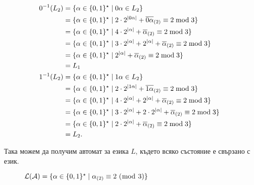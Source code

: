 \begin{align*}
  0^{-1}(L_2) & = \{\alpha \in \{0,1\}^\star \mid 0\alpha \in L_2\}\\
              & = \{\alpha \in \{0,1\}^\star \mid 2\cdot 2^{|0\alpha|} + \overline{0\alpha}_{(2)} \equiv 2 \bmod 3\}\\
              & = \{\alpha \in \{0,1\}^\star \mid 4\cdot 2^{|\alpha|} + \overline{\alpha}_{(2)} \equiv 2 \bmod 3\}\\
              & = \{\alpha \in \{0,1\}^\star \mid 3\cdot 2^{|\alpha|} + 2^{|\alpha|} + \overline{\alpha}_{(2)} \equiv 2 \bmod 3\}\\
              & = \{\alpha \in \{0,1\}^\star \mid 2^{|\alpha|} + \overline{\alpha}_{(2)} \equiv 2 \bmod 3\}\\
              & = L_1
  \\
  1^{-1}(L_2) & = \{\alpha \in \{0,1\}^\star \mid 1\alpha \in L_2\}\\
              & = \{\alpha \in \{0,1\}^\star \mid 2\cdot 2^{|1\alpha|} + \overline{1\alpha}_{(2)} \equiv 2 \bmod 3\}\\
              & = \{\alpha \in \{0,1\}^\star \mid 4\cdot 2^{|\alpha|} + 2^{|\alpha|} + \overline{\alpha}_{(2)} \equiv 2 \bmod 3\}\\
              & = \{\alpha \in \{0,1\}^\star \mid 3\cdot 2^{|\alpha|} + 2\cdot 2^{|\alpha|} + \overline{\alpha}_{(2)} \equiv 2 \bmod 3\}\\
              & = \{\alpha \in \{0,1\}^\star \mid 2\cdot 2^{|\alpha|} + \overline{\alpha}_{(2)} \equiv 2 \bmod 3\}\\
              & = L_2.
\end{align*}

Така можем да получим автомат за езика $L$, където всяко състояние е свързано с език.

\begin{framed}
  \begin{figure}[H]
    \begin{center}
    \end{center}
    \caption{$\mathcal{L}(\mathcal{A}) = \{\alpha\in\{0,1\}^\star \mid \alpha_{(2)} \equiv 2\ (\bmod\ 3)\}$}
  \end{figure}
\end{framed}



